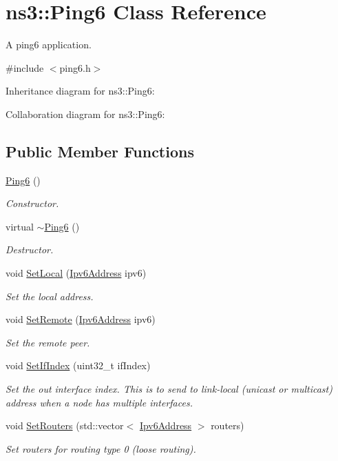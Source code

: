 \hypertarget{classns3_1_1Ping6}{}\section{ns3\+:\+:Ping6 Class Reference}
\label{classns3_1_1Ping6}


A ping6 application.  




{\ttfamily \#include $<$ping6.\+h$>$}



Inheritance diagram for ns3\+:\+:Ping6\+:


Collaboration diagram for ns3\+:\+:Ping6\+:
\subsection*{Public Member Functions}
\begin{DoxyCompactItemize}
\item 
\hyperlink{classns3_1_1Ping6_ae8e1d69e01faad084ccb8e4bbf0d6957}{Ping6} ()
\begin{DoxyCompactList}\small\item\em Constructor. \end{DoxyCompactList}\item 
virtual \hyperlink{classns3_1_1Ping6_a29c4ba03a4cb696f2a028a3f3ba246af}{$\sim$\+Ping6} ()
\begin{DoxyCompactList}\small\item\em Destructor. \end{DoxyCompactList}\item 
void \hyperlink{classns3_1_1Ping6_a3a7f8248e5c937b914d533231bcb632d}{Set\+Local} (\hyperlink{classns3_1_1Ipv6Address}{Ipv6\+Address} ipv6)
\begin{DoxyCompactList}\small\item\em Set the local address. \end{DoxyCompactList}\item 
void \hyperlink{classns3_1_1Ping6_a340214f7c4180611616db281017b1d00}{Set\+Remote} (\hyperlink{classns3_1_1Ipv6Address}{Ipv6\+Address} ipv6)
\begin{DoxyCompactList}\small\item\em Set the remote peer. \end{DoxyCompactList}\item 
void \hyperlink{classns3_1_1Ping6_a854481b6df24d297512c7c476eb7bc7a}{Set\+If\+Index} (uint32\+\_\+t if\+Index)
\begin{DoxyCompactList}\small\item\em Set the out interface index. This is to send to link-\/local (unicast or multicast) address when a node has multiple interfaces. \end{DoxyCompactList}\item 
void \hyperlink{classns3_1_1Ping6_a92f79a3f6766f2ba9d85d65dc0a4e3b4}{Set\+Routers} (std\+::vector$<$ \hyperlink{classns3_1_1Ipv6Address}{Ipv6\+Address} $>$ routers)
\begin{DoxyCompactList}\small\item\em Set routers for routing type 0 (loose routing). \end{DoxyCompactList}\end{DoxyCompactItemize}
